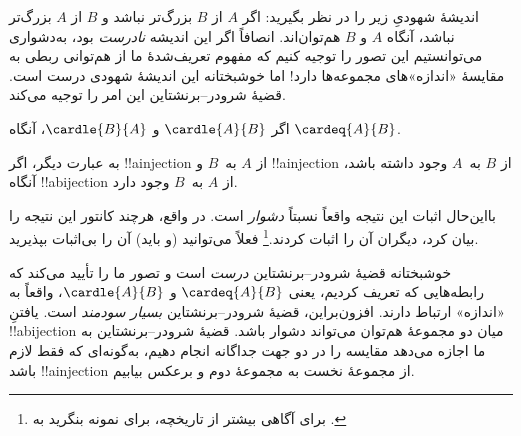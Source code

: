 \documentclass[../../../include/open-logic-section]{subfiles}
\begin{document}


\begin{explain}
اندیشهٔ شهودیِ زیر را در نظر بگیرید: اگر $A$ از $B$ بزرگ‌تر نباشد و
$B$ از $A$ بزرگ‌تر نباشد، آنگاه $A$ و $B$ هم‌توان‌اند. انصافاً اگر این
اندیشه \emph{نادرست} بود، به‌دشواری می‌توانستیم این تصور را توجیه کنیم
که مفهوم تعریف‌شدهٔ ما از هم‌توانی ربطی به مقایسهٔ «اندازه»های
مجموعه‌ها دارد!{} اما خوشبختانه این اندیشهٔ شهودی درست است. قضیهٔ
شرودر–برنشتاین این امر را توجیه می‌کند.
\end{explain}

\begin{thm}
	اگر $\cardle{A}{B}$ و $\cardle{B}{A}$،
	آنگاه $\cardeq{A}{B}$.
\end{thm}

\begin{explain}
به عبارت دیگر، اگر !!a{injection} از $A$ به~$B$ و !!a{injection} از
$B$ به~$A$ وجود داشته باشد، آنگاه !!a{bijection} از $A$ به~$B$ وجود
دارد.

بااین‌حال اثبات این نتیجه واقعاً نسبتاً \emph{دشوار} است. در واقع،
هرچند کانتور این نتیجه را بیان کرد، دیگران آن را اثبات
کردند.\footnote{برای آگاهی بیشتر از تاریخچه، برای نمونه بنگرید به
\citet[صص.~165--6]{Potter2004}.}
%
فعلاً می‌توانید (و باید) آن را بی‌اثبات بپذیرید.

خوشبختانه قضیهٔ شرودر–برنشتاین \emph{درست} است و تصور ما را تأیید
می‌کند که رابطه‌هایی که تعریف کردیم، یعنی $\cardeq{A}{B}$ و
$\cardle{A}{B}$، واقعاً به «اندازه» ارتباط دارند. افزون‌براین، قضیهٔ
شرودر–برنشتاین \emph{بسیار سودمند} است. یافتنِ !!a{bijection} میان دو
مجموعهٔ هم‌توان می‌تواند دشوار باشد. قضیهٔ شرودر–برنشتاین به ما اجازه
می‌دهد مقایسه را در دو جهت جداگانه انجام دهیم، به‌گونه‌ای که فقط لازم باشد
!!a{injection} از مجموعهٔ نخست به مجموعهٔ دوم و برعکس بیابیم.
\end{explain}
\end{document}
